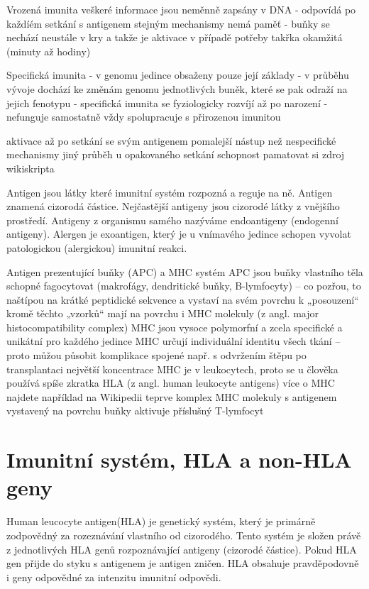 \documentclass[czech,DP]{thesiskiv}
\begin{document}
Vrozená imunita veškeré informace jsou neměnně zapsány v DNA 
- odpovídá po každíém setkání s antigenem stejným mechanismy nemá paměť
- buňky se nechází neustále v kry a takže je aktivace v případě potřeby takřka okamžitá (minuty až hodiny)

Specifická imunita
- v genomu jedince obsaženy pouze její základy
- v průběhu vývoje dochází ke změnám genomu jednotlivých buněk, které se pak odraží na jejich fenotypu
- specifická imunita se fyziologicky rozvíjí až po narození
- nefunguje samostatně vždy spolupracuje s přirozenou imunitou

aktivace až po setkání se svým antigenem
pomalejší nástup než nespecifické mechanismy
jiný průběh u opakovaného setkání
schopnost pamatovat si
zdroj wikiskripta

Antigen jsou látky které imunitní systém rozpozná a reguje na ně. Antigen znamená cizorodá částice. Nejčastější antigeny jsou cizorodé látky z vnějšího prostředí.
Antigeny z organismu samého nazýváme endoantigeny (endogenní antigeny). Alergen je exoantigen, který je u vnímavého jedince schopen vyvolat patologickou (alergickou) imunitní reakci.

Antigen prezentující buňky (APC) a MHC systém
APC jsou buňky vlastního těla schopné fagocytovat (makrofágy, dendritické buňky, B-lymfocyty) – co pozřou, to naštípou na krátké peptidické sekvence a vystaví na svém povrchu k „posouzení“
kromě těchto „vzorků“ mají na povrchu i MHC molekuly (z angl. major histocompatibility complex)
MHC jsou vysoce polymorfní a zcela specifické a unikátní pro každého jedince
MHC určují individuální identitu všech tkání – proto můžou působit komplikace spojené např. s odvržením štěpu po transplantaci
největší koncentrace MHC je v leukocytech, proto se u člověka používá spíše zkratka HLA (z angl. human leukocyte antigens)
více o MHC najdete například na Wikipedii
teprve komplex MHC molekuly s antigenem vystavený na povrchu buňky aktivuje příslušný T-lymfocyt
\section{Imunitní systém, HLA a non-HLA geny}

Human leucocyte antigen(HLA) je genetický systém, který je primárně zodpovědný za rozeznávání vlastního od cizorodého. Tento systém je složen právě z jednotlivých HLA genů rozpoznávající antigeny (cizorodé částice). Pokud HLA gen přijde do styku s antigenem je antigen zničen.
HLA obsahuje pravděpodovně i geny odpovědné za intenzitu imunitní odpovědi.
\end{document}
